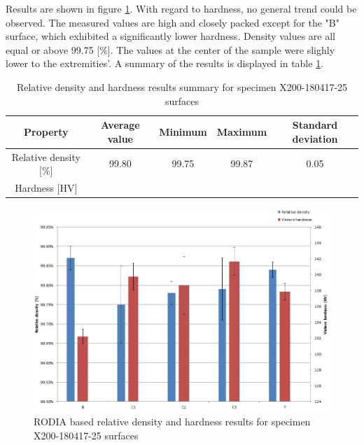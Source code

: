 Results are shown in figure \ref{fig:HD-180417}. With regard to hardness, no general trend could be observed. The measured values are high and closely packed except for the "B" surface, which exhibited a significantly lower hardness. Density values are all equal or above 99.75 [\%]. The values at the center of the sample were slighly lower to the extremities'. A summary of the results is displayed in table \ref{tab:25}.

 \begin{center}
	\begin{table}[ht]
		\begin{tabular}{|c|c |c |c| c|}
			\hline
			Property& Average value & Minimum & Maximum & Standard deviation \\
			\hline 
			\hline   
			Relative density [\%] & 99.80 & 99.75 & 99.87 & 0.05\\
			Hardness [HV] &&&&\\
			\hline
		\end{tabular}
		
		\caption[Relative density and hardness results summary for specimen X200-180417-25 surfaces]{Relative density and hardness results summary for specimen X200-180417-25 surfaces}
		\label{tab:25}
	\end{table}
\end{center}


\begin{figure}[ht]
\centering
\centerline{\includegraphics[scale=0.62]{Images/HD-180417}}
\decoRule
\caption[RODIA based relative density and hardness results for specimen X200-180417-25 surfaces]{RODIA based relative density and hardness results for specimen X200-180417-25 surfaces}
\label{fig:HD-180417}
\end{figure} 

